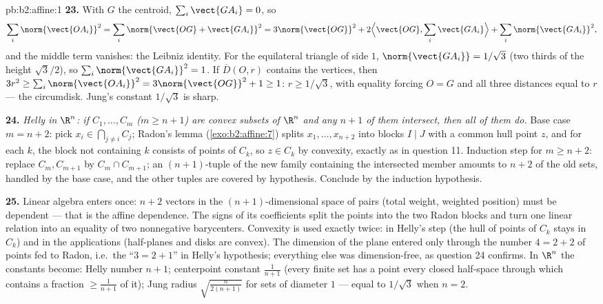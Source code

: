 \begin{solution}{pb:b2:affine:1}
\textbf{23.} With $G$ the centroid, $\sum_i\vect{GA_i} = 0$,
so
\[
\sum_i\norm{\vect{OA_i}}^2 = \sum_i\norm{\vect{OG} +
\vect{GA_i}}^2 = 3\norm{\vect{OG}}^2 + 2\Bigl\langle
\vect{OG}, \sum_i\vect{GA_i}\Bigr\rangle +
\sum_i\norm{\vect{GA_i}}^2,
\]
and the middle term vanishes: the Leibniz identity. For the
equilateral triangle of side $1$, $\norm{\vect{GA_i}} =
1/\sqrt3$ (two thirds of the height $\sqrt3/2$), so
$\sum_i\norm{\vect{GA_i}}^2 = 1$. If $\overline D(O, r)$
contains the vertices, then $3r^2 \geq
\sum_i\norm{\vect{OA_i}}^2 = 3\norm{\vect{OG}}^2 + 1 \geq 1$:
$r \geq 1/\sqrt3$, with equality forcing $O = G$ and all
three distances equal to $r$ --- the circumdisk. Jung's
constant $1/\sqrt3$ is sharp.

\textbf{24.} \emph{Helly in $\R^n$: if $C_1, \dots, C_m$
($m \geq n + 1$) are convex subsets of $\R^n$ and any $n + 1$
of them intersect, then all of them do.} Base case $m = n +
2$: pick $x_i \in \bigcap_{j\neq i}C_j$; Radon's lemma
(\cref{exo:b2:affine:7}) splits $x_1, \dots, x_{n+2}$ into
blocks $I \mid J$ with a common hull point $z$, and for each
$k$, the block not containing $k$ consists of points of
$C_k$, so $z \in C_k$ by convexity, exactly as in question
11. Induction step for $m \geq n + 2$: replace $C_m,
C_{m+1}$ by $C_m \cap C_{m+1}$; an $(n+1)$-tuple of the new
family containing the intersected member amounts to $n + 2$
of the old sets, handled by the base case, and the other
tuples are covered by hypothesis. Conclude by the induction
hypothesis.

\textbf{25.} Linear algebra enters once: $n + 2$ vectors in
the $(n+1)$-dimensional space of pairs (total weight,
weighted position) must be dependent --- that is the affine
dependence. The signs of its coefficients split the points
into the two Radon blocks and turn one linear relation into
an equality of two nonnegative barycenters. Convexity is used
exactly twice: in Helly's step (the hull of points of $C_k$
stays in $C_k$) and in the applications (half-planes and
disks are convex). The dimension of the plane entered only
through the number $4 = 2 + 2$ of points fed to Radon, i.e.\
the ``$3 = 2 + 1$'' in Helly's hypothesis; everything else
was dimension-free, as question 24 confirms. In $\R^n$ the
constants become: Helly number $n + 1$; centerpoint constant
$\frac1{n+1}$ (every finite set has a point every closed
half-space through which contains a fraction $\geq
\frac1{n+1}$ of it); Jung radius
$\sqrt{\frac{n}{2(n+1)}}$ for sets of diameter $1$ --- equal
to $1/\sqrt3$ when $n = 2$.
\end{solution}
